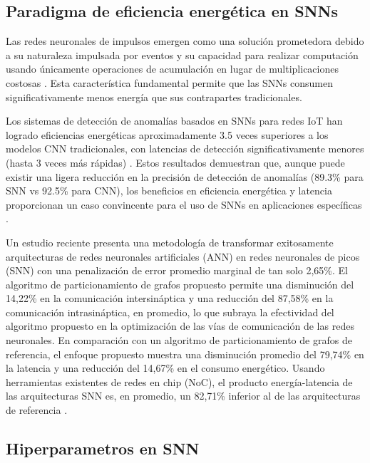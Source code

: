 \subsection{Paradigma de eficiencia energética en SNNs}

Las redes neuronales de impulsos emergen como una solución prometedora debido a su naturaleza impulsada por eventos y su capacidad para realizar computación usando únicamente operaciones de acumulación en lugar de multiplicaciones costosas \cite{jang_bisnn_2021}. Esta característica fundamental permite que las SNNs consumen significativamente menos energía que sus contrapartes tradicionales.

Los sistemas de detección de anomalías basados en SNNs para redes IoT han logrado eficiencias energéticas aproximadamente 3.5 veces superiores a los modelos CNN tradicionales, con latencias de detección significativamente menores (hasta 3 veces más rápidas) \cite{maddula_ai-driven_2024}. Estos resultados demuestran que, aunque puede existir una ligera reducción en la precisión de detección de anomalías (89.3\% para SNN vs 92.5\% para CNN), los beneficios en eficiencia energética y latencia proporcionan un caso convincente para el uso de SNNs en aplicaciones específicas \cite{maddula_ai-driven_2024}.

Un estudio reciente presenta una metodología de transformar exitosamente arquitecturas de redes neuronales artificiales (ANN) en redes neuronales de picos (SNN) con una penalización de error promedio marginal de tan solo 2,65\%. El algoritmo de particionamiento de grafos propuesto permite una disminución del 14,22\% en la comunicación intersináptica y una reducción del 87,58\% en la comunicación intrasináptica, en promedio, lo que subraya la efectividad del algoritmo propuesto en la optimización de las vías de comunicación de las redes neuronales. En comparación con un algoritmo de particionamiento de grafos de referencia, el enfoque propuesto muestra una disminución promedio del 79,74\% en la latencia y una reducción del 14,67\% en el consumo energético. Usando herramientas existentes de redes en chip (NoC), el producto energía-latencia de las arquitecturas SNN es, en promedio, un 82,71\% inferior al de las arquitecturas de referencia \cite{islam_benchmarking_2024}.

\subsection{Hiperparametros en SNN}

